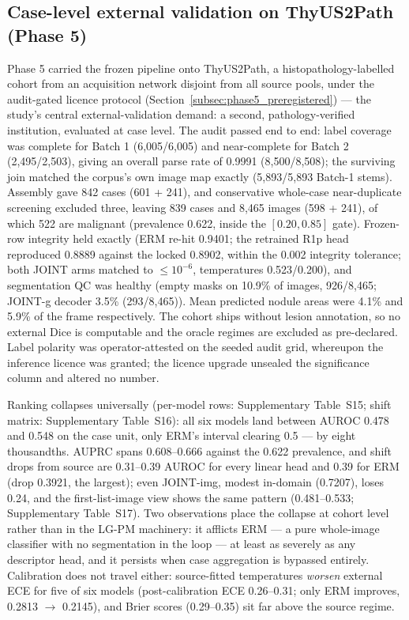 \documentclass[jimh,article,submit,moreauthors,pdftex]{Definitions/tsp}
\begin{document}
\subsection{Case-level external validation on ThyUS2Path (Phase 5)}
\label{subsec:res_phase5}

Phase 5 carried the frozen pipeline onto ThyUS2Path, a
histopathology-labelled cohort from an acquisition network disjoint
from all source pools, under the audit-gated licence protocol
(Section~\ref{subsec:phase5_preregistered}) --- the study's central
external-validation demand: a second, pathology-verified institution,
evaluated at case level. The audit passed end to end: label coverage
was complete for Batch 1 (6{,}005/6{,}005) and near-complete for Batch
2 (2{,}495/2{,}503), giving an overall parse rate of 0.9991
(8{,}500/8{,}508); the surviving join matched the corpus's own image
map exactly (5{,}893/5{,}893 Batch-1 stems). Assembly gave 842
cases (601 + 241), and conservative whole-case near-duplicate
screening excluded three, leaving 839 cases and 8{,}465 images
(598 + 241), of which 522 are malignant
(prevalence 0.622, inside the $[0.20, 0.85]$ gate). Frozen-row
integrity held exactly (ERM re-hit 0.9401; the retrained R1p head
reproduced 0.8889 against the locked 0.8902, within the 0.002
integrity tolerance; both
JOINT arms matched to $\leq 10^{-6}$, temperatures 0.523/0.200), and
segmentation QC was healthy (empty masks on 10.9\% of images,
926/8{,}465; JOINT-g decoder 3.5\% (293/8{,}465)). Mean predicted
nodule areas were 4.1\% and 5.9\% of the frame respectively. The
cohort ships without lesion
annotation, so no external Dice is computable and the oracle regimes
are excluded as pre-declared. Label polarity was operator-attested on
the seeded audit grid, whereupon the inference licence was granted; the
licence upgrade unsealed the significance column and altered no number.

Ranking collapses universally (per-model rows: Supplementary
Table~S15; shift matrix: Supplementary Table~S16): all six models land
between AUROC 0.478 and 0.548 on the case unit, only ERM's interval
clearing 0.5 --- by eight thousandths. AUPRC spans 0.608--0.666
against the 0.622 prevalence, and shift drops from source are
0.31--0.39 AUROC for every linear head and 0.39 for
ERM (drop 0.3921, the largest); even JOINT-img, modest in-domain (0.7207), loses 0.24, and
the first-list-image view shows the same pattern (0.481--0.533;
Supplementary Table~S17). Two observations place the collapse at
cohort level rather than in the LG-PM machinery: it afflicts ERM ---
a pure whole-image classifier with no segmentation in the loop --- at
least as severely as any descriptor head, and it persists when case
aggregation is bypassed entirely. Calibration does not travel either:
source-fitted temperatures \emph{worsen} external ECE for five of six
models (post-calibration ECE 0.26--0.31; only ERM improves, 0.2813
$\to$ 0.2145), and Brier scores (0.29--0.35) sit far above the source
regime.
\end{document}
